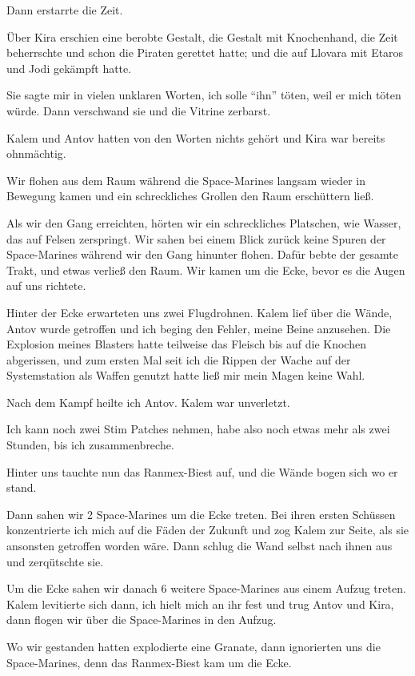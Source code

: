 \documentclass[11pt]{scrartcl}
\begin{document}
Dann erstarrte die Zeit.

Über Kira erschien eine berobte Gestalt, die Gestalt mit Knochenhand,
die Zeit beherrschte und schon die Piraten gerettet hatte; und die auf
Llovara mit Etaros und Jodi gekämpft hatte.

Sie sagte mir in vielen unklaren Worten, ich solle ``ihn'' töten, weil
er mich töten würde. Dann verschwand sie und die Vitrine zerbarst.

Kalem und Antov hatten von den Worten nichts gehört und Kira war bereits
ohnmächtig.

Wir flohen aus dem Raum während die Space-Marines langsam wieder in
Bewegung kamen und ein schreckliches Grollen den Raum erschüttern ließ.

Als wir den Gang erreichten, hörten wir ein schreckliches Platschen, wie
Wasser, das auf Felsen zerspringt. Wir sahen bei einem Blick zurück
keine Spuren der Space-Marines während wir den Gang hinunter flohen.
Dafür bebte der gesamte Trakt, und etwas verließ den Raum. Wir kamen um
die Ecke, bevor es die Augen auf uns richtete.

Hinter der Ecke erwarteten uns zwei Flugdrohnen. Kalem lief über die
Wände, Antov wurde getroffen und ich beging den Fehler, meine Beine
anzusehen. Die Explosion meines Blasters hatte teilweise das Fleisch bis
auf die Knochen abgerissen, und zum ersten Mal seit ich die Rippen der
Wache auf der Systemstation als Waffen genutzt hatte ließ mir mein Magen
keine Wahl.

Nach dem Kampf heilte ich Antov. Kalem war unverletzt.

Ich kann noch zwei Stim Patches nehmen, habe also noch etwas mehr als
zwei Stunden, bis ich zusammenbreche.

Hinter uns tauchte nun das Ranmex-Biest auf, und die Wände bogen sich wo
er stand.

Dann sahen wir 2 Space-Marines um die Ecke treten. Bei ihren ersten
Schüssen konzentrierte ich mich auf die Fäden der Zukunft und zog Kalem
zur Seite, als sie ansonsten getroffen worden wäre. Dann schlug die Wand
selbst nach ihnen aus und zerqütschte sie.

Um die Ecke sahen wir danach 6 weitere Space-Marines aus einem Aufzug
treten.\\ Kalem levitierte sich dann, ich hielt mich an ihr fest und
trug Antov und Kira, dann flogen wir über die Space-Marines in den
Aufzug.

Wo wir gestanden hatten explodierte eine Granate, dann ignorierten uns
die Space-Marines, denn das Ranmex-Biest kam um die Ecke.
\end{document}
